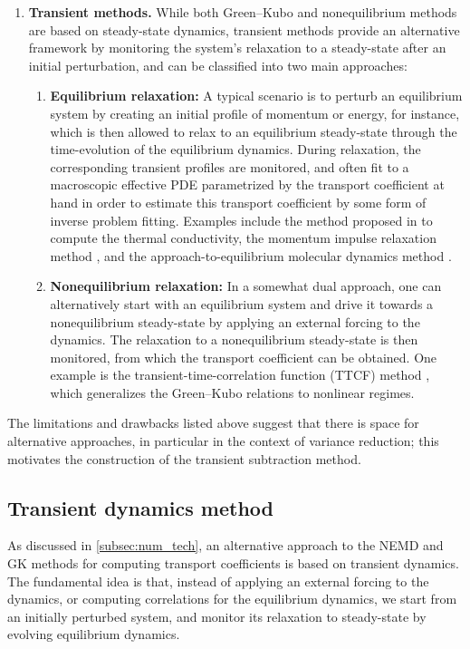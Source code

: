 \documentclass[11pt]{article}
\theoremstyle{definition}
\begin{document}
\begin{enumerate}
    \item {\bf Transient methods.} While both Green--Kubo and nonequilibrium methods are based on steady-state dynamics, transient methods provide an alternative framework by monitoring the system's relaxation to a steady-state after an initial perturbation, and can be classified into two main approaches:
    
    \begin{enumerate}
        \item {\bf Equilibrium relaxation:} A typical scenario is to perturb an equilibrium system by creating an initial profile of momentum or energy, for instance, which is then allowed to relax to an equilibrium steady-state through the time-evolution of the equilibrium dynamics. During relaxation, the corresponding transient profiles are monitored, and often fit to a macroscopic effective PDE parametrized by the transport coefficient at hand in order to estimate this transport coefficient by some form of inverse problem fitting. Examples include the method proposed in \cite{hulse2005} to compute the thermal conductivity, the momentum impulse relaxation method \cite{arya2000}, and the approach-to-equilibrium molecular dynamics method \cite{lampin2013}.
                
        \item {\bf Nonequilibrium relaxation:} In a somewhat dual approach, one can alternatively start with an equilibrium system and drive it towards a nonequilibrium steady-state by applying an external forcing to the dynamics. The relaxation to a nonequilibrium steady-state is then monitored, from which the transport coefficient can be obtained. One example is the transient-time-correlation function (TTCF) method \cite{morriss1987,evans1988}, which generalizes the Green--Kubo relations to nonlinear regimes.
    \end{enumerate}
\end{enumerate}
The limitations and drawbacks listed above suggest that there is space for alternative approaches, in particular in the context of variance reduction; this motivates the construction of the transient subtraction method.

\subsection{Transient dynamics method}
\label{subsec:transient}
As discussed in \cref{subsec:num_tech}, an alternative approach to the NEMD and GK methods for computing transport coefficients is based on transient dynamics. The fundamental idea is that, instead of applying an external forcing to the dynamics, or computing correlations for the equilibrium dynamics, we start from an initially perturbed system, and monitor its relaxation to steady-state by evolving equilibrium dynamics.
\end{document}
